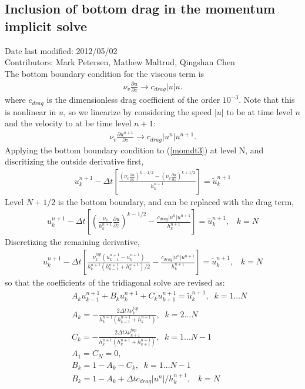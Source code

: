 \documentclass[11pt]{report}
\begin{document}
\subsection{Inclusion of bottom drag in the momentum implicit solve}
Date last modified: 2012/05/02 \\
Contributors: Mark Petersen, Mathew Maltrud, Qingshan Chen \\

The bottom boundary condition for the viscous term is 
\begin{eqnarray}
\nu_v \frac{\partial u}{\partial z} \rightarrow c_{drag}|u| u.
\end{eqnarray}
where $c_{drag}$ is the dimensionless drag coefficient of the order $10^{-3}$.  Note that this is nonlinear in $u$, so we linearize by considering the speed $|u|$ to be at time level $n$ and the velocity to at be time level $n+1$:
\begin{eqnarray}
\nu_v \frac{\partial u^{n+1}}{\partial z} \rightarrow c_{drag}|u^n| u^{n+1}.
\end{eqnarray}
Applying the bottom boundary condition to (\ref{momdt3}) at level N, and discritizing the outside derivative first,
\begin{eqnarray}
\label{momdt5}
u^{n+1}_k - \Delta t \left[ 
\frac{
  \left( \nu_v \frac{\partial u}{\partial z}\right)^{k-1/2}
- \left( \nu_v \frac{\partial u}{\partial z}\right)^{k+1/2}
}{h_k^{n+1}}\right]
= \tilde{u}^{n+1}_k
\end{eqnarray}
Level $N+1/2$ is the bottom boundary, and can be replaced with the drag term,
\begin{eqnarray}
\label{momdt6}
u^{n+1}_k - \Delta t \left[ 
  \left( \frac{\nu_v}{h_k^{n+1}} \frac{\partial u}{\partial z}\right)^{k-1/2}
- \frac{c_{drag}|u^n| u^{n+1}}{h_k^{n+1}}
\right]
= \tilde{u}^{n+1}_k,\;\;\;k=N
\end{eqnarray}
Discretizing the remaining derivative,
\begin{eqnarray}
\label{momdt7}
u^{n+1}_k - \Delta t \left[ 
\frac{\nu^{top}_{k}(u^{n+1}_{k-1} - u^{n+1}_{k})}
{h_k^{n+1}(h_{k-1}^{n+1} + h_{k}^{n+1})/2}
- \frac{c_{drag}|u^n| u^{n+1}}{h_k^{n+1}}
\right]
= \tilde{u}^{n+1}_k,\;\;\;k=N
\end{eqnarray}
so that the coefficients of the tridiagonal solve are revised as:
\begin{eqnarray}
\label{momtridiag2}
&& A_{k} u^{n+1}_{k-1} + B_k u^{n+1}_k +  C_k u^{n+1}_{k+1} 
= \tilde{u}^{n+1}_k, \;\; k=1\ldots N\\
&& A_k = -\frac{2 \Delta t \lambda \nu^{top}_{k}}{h_k^{n+1}(h_{k-1}^{n+1} + h_{k}^{n+1})}, \;\; k=2\ldots N \\
&& C_k = -\frac{2 \Delta t \lambda \nu^{top}_{k+1}}{h_k^{n+1}(h_k^{n+1} + h_{k+1}^{n+1})}, \;\; k=1\ldots N-1 \\
&& A_1=C_N=0, \\
&& B_k = 1 - A_k - C_{k}, \;\; k=1\ldots N-1 \\
&& B_k = 1 - A_k + \Delta t c_{drag}|u^n| /h_k^{n+1}, \;\;\;k=N
\end{eqnarray}
\end{document}
